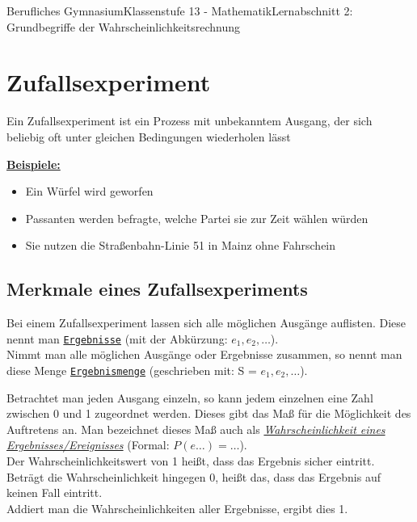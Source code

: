 \documentclass[11pt,twocolumn,oneside,openany,headings=optiontotoc,11pt,numbers=noenddot]{article}
\begin{document}
	\begin{worksheet}{Berufliches Gymnasium}{Klassenstufe 13 - Mathematik}{Lernabschnitt 2: Grundbegriffe der Wahrscheinlichkeitsrechnung}
		\section{Zufallsexperiment}
		Ein Zufallsexperiment ist ein Prozess mit unbekanntem Ausgang, der sich beliebig oft unter gleichen Bedingungen wiederholen lässt\\
		\par\noindent
		\underline{\textbf{Beispiele:}}
		\begin{itemize}[label=-]
		\item Ein Würfel wird geworfen
		\item Passanten werden befragte, welche Partei sie zur Zeit wählen würden
		\item Sie nutzen die Straßenbahn-Linie 51 in Mainz ohne Fahrschein
		\end{itemize}
		\subsection{Merkmale eines Zufallsexperiments}
		Bei einem Zufallsexperiment lassen sich alle möglichen Ausgänge auflisten. Diese nennt man \underline{\texttt{Ergebnisse}} (mit der Abkürzung: \(e_1, e_2,\ldots\)).\\
		Nimmt man alle möglichen Ausgänge oder Ergebnisse zusammen, so nennt man diese Menge \underline{\texttt{Ergebnismenge}} (geschrieben mit: S = \({e_1, e_2, \ldots}\)).\\
		\par\noindent
		Betrachtet man jeden Ausgang einzeln, so kann jedem einzelnen eine Zahl zwischen 0 und 1 zugeordnet werden. Dieses gibt das Maß für die Möglichkeit des Auftretens an. Man bezeichnet dieses Maß auch als \underline{\textit{Wahrscheinlichkeit eines Ergebnisses/Ereignisses}} (Formal: \(P(e\ldots) = \ldots\)).\\
		Der Wahrscheinlichkeitswert von \grqq{}1\grqq{} heißt, dass das Ergebnis sicher eintritt. Beträgt die Wahrscheinlichkeit hingegen \grqq{}0\grqq{}, heißt das, dass das Ergebnis auf keinen Fall eintritt.\\
		Addiert man die Wahrscheinlichkeiten aller Ergebnisse, ergibt dies \grqq{}1\grqq{}.

\end{worksheet}
\end{document}

